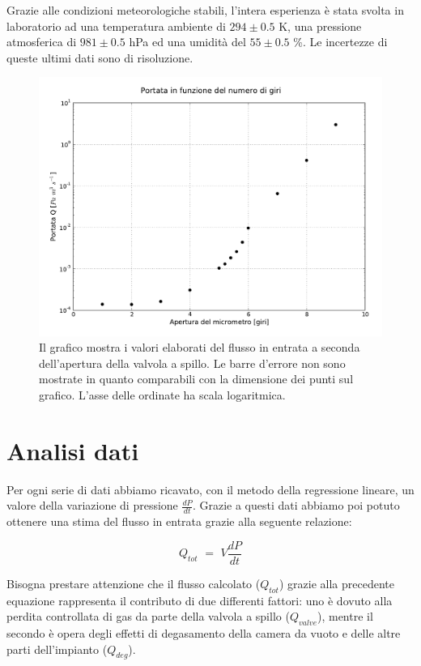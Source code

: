 Grazie alle condizioni meteorologiche stabili, l'intera esperienza è stata svolta in laboratorio ad una temperatura ambiente di $294 \pm 0.5$ \si{\kelvin}, una pressione atmosferica di $981 \pm 0.5$ hPa ed una umidità del $55 \pm 0.5$ \%. Le incertezze di queste ultimi dati sono di risoluzione.

\begin{figure}[h!]
    \includegraphics[width=15cm]{graph.pdf}
    \caption{Il grafico mostra i valori elaborati del flusso in entrata a seconda dell'apertura della valvola a spillo. Le barre d'errore non sono
    mostrate in quanto comparabili con la dimensione dei punti sul grafico. L'asse delle ordinate ha scala logaritmica.}
    \label{fig:graph}
\end{figure}

\section{Analisi dati}

Per ogni serie di dati abbiamo ricavato, con il metodo della regressione lineare, un valore della variazione di pressione $\frac{dP}{dt}$. Grazie a questi dati abbiamo poi potuto ottenere una stima del flusso in entrata grazie alla seguente relazione:

\begin{equation}
	Q_{tot} \,\, = \,\, V \frac{dP}{dt}
\end{equation}

Bisogna prestare attenzione che il flusso calcolato ($Q_{tot}$) grazie alla precedente equazione rappresenta il contributo di due differenti fattori: uno è dovuto alla perdita controllata di gas da parte della valvola a spillo ($Q_{valve}$), mentre il secondo è opera degli effetti di degasamento della camera da vuoto e delle altre parti dell'impianto ($Q_{deg}$).

